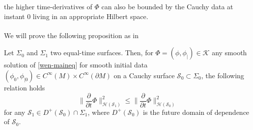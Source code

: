 the higher time-derivatives of $\Phi$ can also be bounded by the Cauchy data at instant $0$ living in an appropriate Hilbert space.\\\\
We will prove the following proposition as in~\cite{Zahn2016}
\begin{proposition}\label{wen-propcau}
Let $\Sigma_0$ and $\Sigma_1$ two equal-time surfaces. 
Then, for $\Phi = (\phi, \phi_|) \in \mathcal{K}$ any smooth solution of \cref{wen-maineq} for smooth initial data $(\phi_0, \phi_{|0}) \in C^\infty(M) \times C^\infty(\partial M)$ on a Cauchy surface $\mathcal{S}_0 \subset \Sigma_0$,
the following relation holds
\begin{equation}\label{wen-causal}
\big\| \frac{\partial}{\partial t} \Phi \big\|_{\mathcal{H}(\mathcal{S}_1)}^2
\leq 
\big\| \frac{\partial}{\partial t} \Phi \big\|_{\mathcal{H}(\mathcal{S}_0)}^2
\end{equation}
for any $\mathcal{S}_1 \in D^+(\mathcal{S}_0)\cap\Sigma_1$, where $D^+(\mathcal{S}_0)$ is the future domain of dependence of $\mathcal{S}_0$.
\end{proposition}
